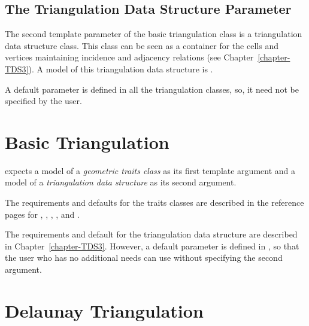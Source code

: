 \subsection{The Triangulation Data Structure Parameter}
\label{Triangulation3-sec-tds}

The second template parameter of the basic triangulation class
 is a triangulation 
data structure class.  This class can be seen as a container for the
cells and vertices maintaining incidence and adjacency relations (see
Chapter~\ref{chapter-TDS3}).  A model of this triangulation data
structure is .

A default parameter is defined in all the triangulation classes, so, it 
need not be specified by the user. 

\section{Basic Triangulation}

expects a model of a 
\textit{geometric traits class} as its first template argument and a model 
of a \textit{triangulation data structure} as its second argument.

The requirements and defaults for the traits classes are described in
the reference pages for 
,
, 
,
 , 
and
.

The requirements and default for the triangulation data structure are
described in Chapter~\ref{chapter-TDS3}. However, a default parameter
is defined in , so that the user who 
has no additional needs can use
 without specifying the 
second argument.

\section{Delaunay Triangulation} 

